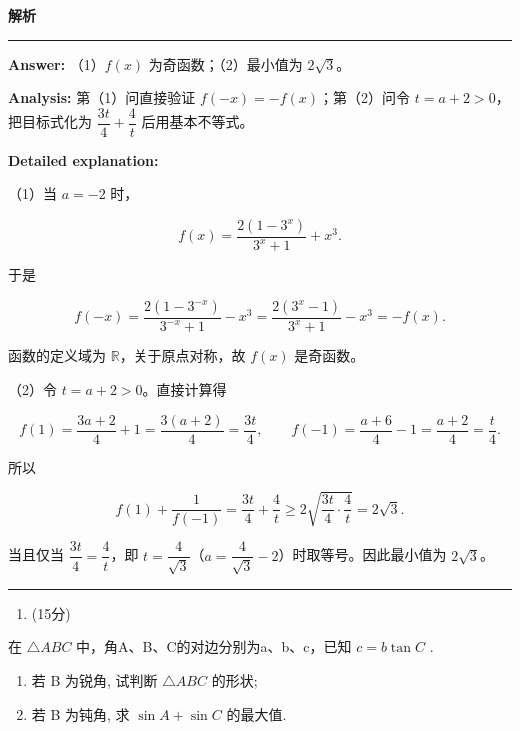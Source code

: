 \documentclass[UTF8,12pt,a4paper]{ctexart}
\renewcommand{\labelenumi}{\arabic{enumi}.}
\newenvironment{examSolutionBox}{%
  \par\medskip\begingroup
  \setlength{\leftskip}{1.0em}\setlength{\rightskip}{0.9em}%
  \noindent\textcolor{SolutionTeal}{\bfseries\large 解析}\par
  \smallskip\noindent\textcolor{SolutionRule}{\rule{\dimexpr\linewidth-\leftskip-\rightskip\relax}{0.8pt}}\par
  \smallskip\color{SolutionInk}%
}{%
  \par\smallskip\noindent\textcolor{SolutionRule}{\rule{\dimexpr\linewidth-\leftskip-\rightskip\relax}{0.8pt}}\par
  \endgroup\medskip
}
\providecommand{\tightlist}{%
  \setlength{\itemsep}{0pt}\setlength{\parskip}{0pt}}
\begin{document}
\begin{examSolutionBox}

\textbf{Answer:} （1）\(f(x)\) 为奇函数；（2）最小值为 \(2\sqrt3\)。

\textbf{Analysis:} 第（1）问直接验证 \(f(-x)=-f(x)\)；第（2）问令 \(t=a+2>0\)，把目标式化为 \(\dfrac{3t}{4}+\dfrac4t\) 后用基本不等式。

\textbf{Detailed explanation:}

（1）当 \(a=-2\) 时，

\[
   f(x)=\dfrac{2(1-3^x)}{3^x+1}+x^3.
   \]

于是

\[
   f(-x)=\dfrac{2(1-3^{-x})}{3^{-x}+1}-x^3
   =\dfrac{2(3^x-1)}{3^x+1}-x^3=-f(x).
   \]

函数的定义域为 \(\mathbb R\)，关于原点对称，故 \(f(x)\) 是奇函数。

（2）令 \(t=a+2>0\)。直接计算得

\[
   f(1)=\dfrac{3a+2}{4}+1=\dfrac{3(a+2)}4=\dfrac{3t}{4},
   \qquad
   f(-1)=\dfrac{a+6}{4}-1=\dfrac{a+2}{4}=\dfrac t4.
   \]

所以

\[
   f(1)+\dfrac1{f(-1)}=\dfrac{3t}{4}+\dfrac4t
   \ge 2\sqrt{\dfrac{3t}{4}\cdot\dfrac4t}=2\sqrt3.
   \]

当且仅当 \(\dfrac{3t}{4}=\dfrac4t\)，即 \(t=\dfrac4{\sqrt3}\)（\(a=\dfrac4{\sqrt3}-2\)）时取等号。因此最小值为 \(2\sqrt3\)。

\end{examSolutionBox}

\begin{enumerate}
\def\labelenumi{\arabic{enumi}.}
\setcounter{enumi}{16}
\tightlist
\item
  (15分)
\end{enumerate}

在 \(\triangle ABC\) 中，角A、B、C的对边分别为a、b、c，已知 \(c=b\tan C\) .

\begin{enumerate}
\def\labelenumi{(\arabic{enumi})}
\item
  若 B 为锐角, 试判断 \(\triangle ABC\) 的形状;
\item
  若 B 为钝角, 求 \(\sin A + \sin C\) 的最大值.
\end{enumerate}
\end{document}
